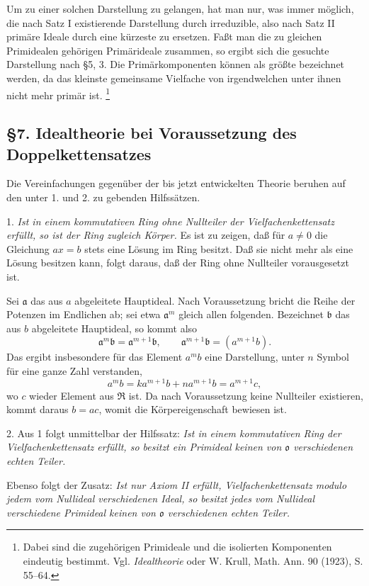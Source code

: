 \documentclass[11pt]{article}
\providecommand{\mR}{\mathfrak{R}}
\providecommand{\ma}{\mathfrak{a}}
\providecommand{\mb}{\mathfrak{b}}
\providecommand{\mo}{\mathfrak{o}}
\begin{document}
Um zu einer solchen Darstellung zu gelangen, hat man nur, was immer möglich, die nach Satz I existierende Darstellung durch irreduzible, also nach Satz II primäre Ideale durch eine kürzeste zu ersetzen. Faßt man die zu gleichen Primidealen gehörigen Primärideale zusammen, so ergibt sich die gesuchte Darstellung nach §5, 3. Die Primärkomponenten können als größte bezeichnet werden, da das kleinste gemeinsame Vielfache von irgendwelchen unter ihnen nicht mehr primär ist.
\footnote{Dabei sind die zugehörigen Primideale und die isolierten Komponenten eindeutig bestimmt. Vgl. \emph{Idealtheorie} oder W. Krull, Math. Ann. 90 (1923), S. 55--64.}

\subsection*{§7. Idealtheorie bei Voraussetzung des Doppelkettensatzes}

Die Vereinfachungen gegenüber der bis jetzt entwickelten Theorie beruhen auf den unter 1. und 2. zu gebenden Hilfssätzen.

1. \emph{Ist in einem kommutativen Ring ohne Nullteiler der Vielfachenkettensatz erfüllt, so ist der Ring zugleich Körper.} Es ist zu zeigen, daß für $a\ne0$ die Gleichung $ax=b$ stets eine Lösung im Ring besitzt. Daß sie nicht mehr als eine Lösung besitzen kann, folgt daraus, daß der Ring ohne Nullteiler vorausgesetzt ist.

Sei $\ma$ das aus $a$ abgeleitete Hauptideal. Nach Voraussetzung bricht die Reihe der Potenzen im Endlichen ab; sei etwa $\ma^m$ gleich allen folgenden. Bezeichnet $\mb$ das aus $b$ abgeleitete Hauptideal, so kommt also
\[
\ma^m\mb=\ma^{m+1}\mb,
\qquad \ma^{m+1}\mb=(a^{m+1}b).
\]
Das ergibt insbesondere für das Element $a^m b$ eine Darstellung, unter $n$ Symbol für eine ganze Zahl verstanden,
\[
 a^m b=k a^{m+1}b+n a^{m+1}b=a^{m+1}c,
\]
wo $c$ wieder Element aus $\mR$ ist. Da nach Voraussetzung keine Nullteiler existieren, kommt daraus $b=ac$, womit die Körpereigenschaft bewiesen ist.

2. Aus 1 folgt unmittelbar der Hilfssatz: \emph{Ist in einem kommutativen Ring der Vielfachenkettensatz erfüllt, so besitzt ein Primideal keinen von $\mo$ verschiedenen echten Teiler.}

Ebenso folgt der Zusatz: \emph{Ist nur Axiom II erfüllt, Vielfachenkettensatz modulo jedem vom Nullideal verschiedenen Ideal, so besitzt jedes vom Nullideal verschiedene Primideal keinen von $\mo$ verschiedenen echten Teiler.}
\end{document}
